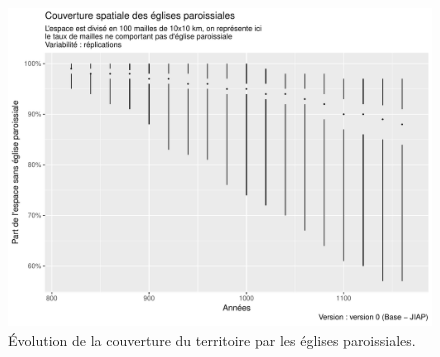 \begin{figure}[H]
\captionsetup{width=\linewidth}
\includegraphics[width=0.9\linewidth]{img/resultats/v0_paroisses_occupation.pdf}
\caption{Évolution de la couverture du territoire par les églises paroissiales.\\
} 
\label{fig:couverture-paroisses-v0} 
\end{figure}
